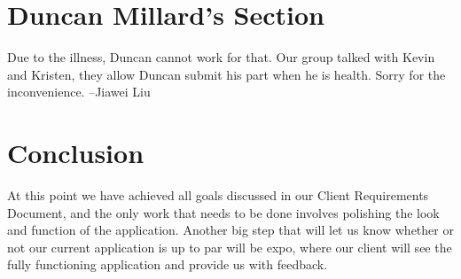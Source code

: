 \documentclass[letterpaper, 10pt,titlepage]{article}
\begin{document}
\section{Duncan Millard's Section}

Due to the illness, Duncan cannot work for that. Our group talked with Kevin and Kristen, they allow Duncan submit his part when he is health. Sorry for the inconvenience.  --Jiawei Liu


\vspace{0.5cm}

\section{Conclusion}
At this point we have achieved all goals discussed in our Client Requirements Document, and the only work that needs to be done involves polishing the look and function of the application. Another big step that will let us know whether or not our current application is up to par will be expo, where our client will see the fully functioning application and provide us with feedback.
\end{document}
